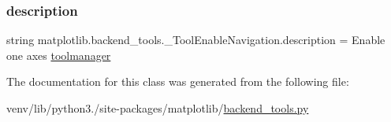 \subsubsection{\texorpdfstring{description}{description}}
{\footnotesize\ttfamily string matplotlib.\+backend\+\_\+tools.\+\_\+\+Tool\+Enable\+Navigation.\+description = \textquotesingle{}Enable one axes \hyperlink{classmatplotlib_1_1backend__tools_1_1ToolBase_aa7888dab7ba0552f93037f1df4b192f6}{toolmanager}\textquotesingle{}\hspace{0.3cm}{\ttfamily [static]}}



The documentation for this class was generated from the following file\+:\begin{DoxyCompactItemize}
\item 
venv/lib/python3./site-\/packages/matplotlib/\hyperlink{backend__tools_8py}{backend\+\_\+tools.\+py}\end{DoxyCompactItemize}
